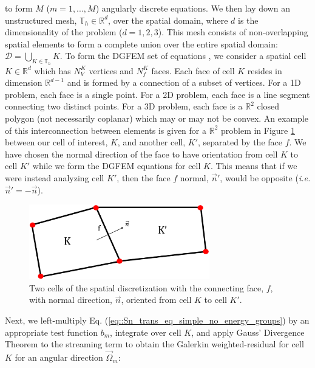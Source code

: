 \noindent to form $M$ ($m=1,...,M$) angularly discrete equations. We then lay down an unstructured mesh, $\mathbb{T}_h \in \mathbb{R}^{d}$, over the spatial domain, where $d$ is the dimensionality of the problem ($d=1,2,3$). This mesh consists of non-overlapping spatial elements to form a complete union over the entire spatial domain: $\mathcal{D} = \bigcup_{K \in \mathbb{T}_h} K$. To form the DGFEM set of equations \cite{ern2013theory,wareing2001discontinuous}, we consider a spatial cell $K \in \mathbb{R}^d$ which has $N_V^K$ vertices and $N_f^K$ faces. Each face of cell $K$ resides in dimension $\mathbb{R}^{d-1}$ and is formed by a connection of a subset of vertices. For a 1D problem, each face is a single point. For a 2D problem, each face is a line segment connecting two distinct points. For a 3D problem, each face is a $\mathbb{R}^2$ closed polygon (not necessarily coplanar) which may or may not be convex. An example of this interconnection between elements is given for a $\mathbb{R}^2$ problem in Figure \ref{fig::Sn_two_ref_cells} between our cell of interest, $K$, and another cell, $K'$, separated by the face $f$. We have chosen the normal direction of the face to have orientation from cell $K$ to cell $K'$ while we form the DGFEM equations for cell $K$. This means that if we were instead analyzing cell $K'$, then the face $f$ normal, $\vec{n}' $, would be opposite ({\em i.e.} $\vec{n}' = -\vec{n}$).

\begin{figure}
\centering
\includegraphics[width=0.7\textwidth]{figures/sec_Sn/two_cells_Rev1.eps}
\caption[Two cells of the spatial discretization]{Two cells of the spatial discretization with the connecting face, $f$, with normal direction, $\vec{n}$, oriented from cell $K$ to cell $K'$.}
\label{fig::Sn_two_ref_cells}
\end{figure}

Next, we left-multiply Eq. (\ref{eq::Sn_trans_eq_simple_no_energy_groups}) by an appropriate test function $b_m$, integrate over cell $K$, and apply Gauss' Divergence Theorem to the streaming term to obtain the Galerkin weighted-residual for cell $K$ for an angular direction $\vec{\Omega}_m$:

